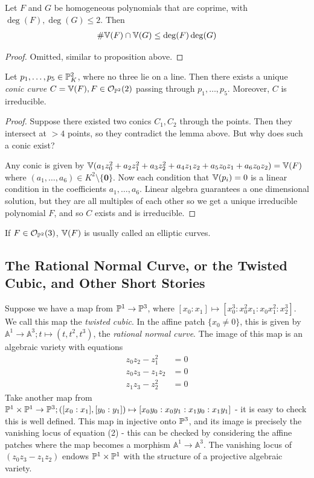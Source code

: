 \documentclass[10pt,a4paper,rgb]{article}
\newcommand{\A}{\mathbb{A}}
\begin{document}
\begin{lemma}
Let $F$ and $G$ be homogeneous polynomials that are coprime, with $\deg(F), \deg(G) \leq 2$. Then
\begin{align*}
\# \V(F) \cap \V(G) \leq \deg(F)\deg(G)
\end{align*}
\end{lemma}
\begin{proof}
Omitted, similar to proposition above.
\end{proof}
\begin{proposition}
Let $p_1, \ldots, p_5 \in \P^2_K$, where no three lie on a line. Then there exists a unique \emph{conic curve} $C = \V(F), F \in \mathcal{O}_{\P^2}(2)$ passing through $p_1, \ldots, p_5$. Moreover, $C$ is irreducible.
\end{proposition}
\begin{proof}
Suppose there existed two conics $C_1, C_2$ through the points. Then they intersect at $>4$ points, so they contradict the lemma above. But why does such a conic exist?

Any conic is given by $\V(a_1z_0^2+a_2z_1^2+a_3z_2^2+a_4z_1z_2+a_5z_0z_1+a_6z_0z_2) = \V(F)$ where $(a_1, \ldots, a_6) \in K^2\setminus \{\mathbf{0}\}$. Now each condition that $\V(p_i) = 0$ is a linear condition in the coefficients $a_1, \ldots, a_6$. Linear algebra guarantees a one dimensional solution, but they are all multiples of each other so we get a unique irreducible polynomial $F$, and so $C$ exists and is irreducible.
\end{proof}
If $F \in \mathcal{O}_{\P^2}(3)$, $\V(F)$ is usually called an elliptic curves.

\subsection{The Rational Normal Curve, or the Twisted Cubic, and Other Short Stories}
Suppose we have a map from $\P^1 \to \P^3$, where $[x_0:x_1]\mapsto [x_0^3:x_0^2x_1:x_0x_1^2:x_2^3]$. We call this map the \emph{twisted cubic}. In the affine patch $\{x_0 \neq 0\}$, this is given by $\A^1 \to \A^3; t \mapsto (t, t^2, t^3)$, the \emph{rational normal curve}. The image of this map is an algebraic variety with equations
\begin{align}
z_0z_2 - z_1^2 &= 0\\
z_0z_3 - z_1z_2 &= 0\\
z_1z_3 - z_2^2 &= 0
\end{align}
Take another map from $\P^1 \times \P^1 \to \P^3; ([x_0:x_1], [y_0:y_1]) \mapsto [x_0y_0:x_0y_1:x_1y_0:x_1y_1]$ - it is easy to check this is well defined. This map in injective onto $\P^3$, and its image is precisely the vanishing locus of equation (2) - this can be checked by considering the affine patches where the map becomes a morphism $\mathbb{A}^1 \to \mathbb{A}^3$. The vanishing locus of $(z_0z_3 - z_1z_2)$ endows $\P^1 \times \P^1$ with the structure of a projective algebraic variety.
\end{document}
